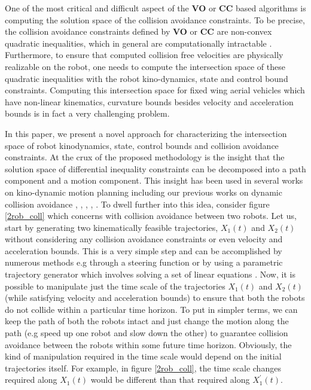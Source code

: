 \documentclass[letterpaper, 10 pt, conference]{IEEEtran}  %
\begin{document}

One of the most critical and difficult aspect of the \textbf{VO} or \textbf{CC} based algorithms is computing the solution space of the collision avoidance constraints. To be precise, the collision avoidance constraints defined by \textbf{VO} or \textbf{CC} are non-convex quadratic inequalities, which in general are computationally intractable \cite{qcqp}. Furthermore, to ensure that computed collision free velocities are physically realizable on the robot, one needs to compute the intersection space of these quadratic inequalities with the robot kino-dynamics, state and control bound constraints.  Computing this intersection space for  fixed wing aerial vehicles which have non-linear kinematics, curvature bounds besides velocity and acceleration bounds is in fact a very challenging problem. 

In this paper, we present a novel approach for characterizing the intersection space of robot kinodynamics, state, control bounds and collision avoidance constraints. At the crux of the proposed methodology is the insight that the solution space of differential inequality constraints can be decomposed into a path component and a motion component. This insight has been used in several works on kino-dynamic motion planning including our previous works on dynamic collision avoidance \cite{cuong_topp}, \cite{cuong_avp} \cite{iros12}, \cite{cdc13}, \cite{iros14}, \cite{iros15}. To dwell further into this idea, consider figure \ref{2rob_coll} which concerns with collision avoidance between two robots. Let us, start by generating two kinematically  feasible trajectories, $X_1(t)$ and $X_2(t)$ without considering any collision avoidance constraints or even velocity and acceleration bounds. This is a very simple step and can be accomplished by numerous methods e.g through a steering function \cite{steering} or by using a parametric trajectory generator which involves solving a set of linear equations \cite{iros14}. Now, it is possible to manipulate just the time scale of the trajectories $X_1(t)$ and $X_2(t)$ (while satisfying velocity and acceleration bounds) to ensure that both the robots do not collide within a particular time horizon. To put in simpler terms, we can keep the path of both the robots intact and just change the motion along the path (e.g speed up one robot and slow down the other) to guarantee collision avoidance between the robots within some future time horizon. Obviously, the kind of manipulation required in the time scale would depend on the initial trajectories itself. For example, in figure \ref{2rob_coll}, the time scale changes required along $X_1(t)$ would be different than that required along $X^{'}_1(t)$.
\end{document}
